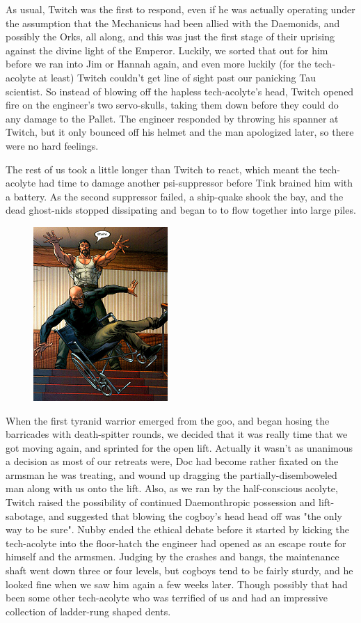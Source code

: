 As usual, Twitch was the first to respond, even if he was actually operating under the assumption that the Mechanicus had been allied with the Daemonids, and possibly the Orks, all along, and this was just the first stage of their uprising against the divine light of the Emperor. 
Luckily, we sorted that out for him before we ran into Jim or Hannah again, and even more luckily (for the tech-acolyte at least) Twitch couldn't get line of sight past our panicking Tau scientist. 
So instead of blowing off the hapless tech-acolyte's head, Twitch opened fire on the engineer's two servo-skulls, taking them down before they could do any damage to the Pallet. 
The engineer responded by throwing his spanner at Twitch, but it only bounced off his helmet and the man apologized later, so there were no hard feelings.

The rest of us took a little longer than Twitch to react, which meant the tech-acolyte had time to damage another psi-suppressor before Tink brained him with a battery. 
As the second suppressor failed, a ship-quake shook the bay, and the dead ghost-nids stopped dissipating and began to to flow together into large piles.

\begin{figure}
	\begin{center}
		\includegraphics[width=\figwidth]{pics/15/57.png}
	\end{center}
\end{figure}
When the first tyranid warrior emerged from the goo, and began hosing the barricades with death-spitter rounds, we decided that it was really time that we got moving again, and sprinted for the open lift. 
Actually it wasn't as unanimous a decision as most of our retreats were, Doc had become rather fixated on the armsman he was treating, and wound up dragging the partially-disemboweled man along with us onto the lift. 
Also, as we ran by the half-conscious acolyte, Twitch raised the possibility of continued Daemonthropic possession and lift-sabotage, and suggested that blowing the cogboy's head head off was "the only way to be sure". 
Nubby ended the ethical debate before it started by kicking the tech-acolyte into the floor-hatch the engineer had opened as an escape route for himself and the armsmen. 
Judging by the crashes and bangs, the maintenance shaft went down three or four levels, but cogboys tend to be fairly sturdy, and he looked fine when we saw him again a few weeks later. 
Though possibly that had been some other tech-acolyte who was terrified of us and had an impressive collection of ladder-rung shaped dents.

